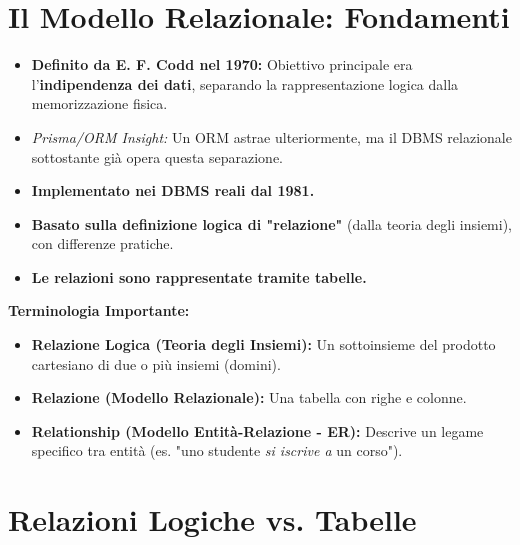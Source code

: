 \documentclass{article}
\begin{document}
	\section{Il Modello Relazionale: Fondamenti}
	\begin{itemize}
		\item \textbf{Definito da E. F. Codd nel 1970:} Obiettivo principale era l'\textbf{indipendenza dei dati}, separando la rappresentazione logica dalla memorizzazione fisica.
		\item \textit{Prisma/ORM Insight:} Un ORM astrae ulteriormente, ma il DBMS relazionale sottostante già opera questa separazione.
		\item \textbf{Implementato nei DBMS reali dal 1981.}
		\item \textbf{Basato sulla definizione logica di "relazione"} (dalla teoria degli insiemi), con differenze pratiche.
		\item \textbf{Le relazioni sono rappresentate tramite tabelle.}
	\end{itemize}
	
	\textbf{Terminologia Importante:}
	\begin{itemize}
		\item \textbf{Relazione Logica (Teoria degli Insiemi):} Un sottoinsieme del prodotto cartesiano di due o più insiemi (domini).
		\item \textbf{Relazione (Modello Relazionale):} Una tabella con righe e colonne.
		\item \textbf{Relationship (Modello Entità-Relazione - ER):} Descrive un legame specifico tra entità (es. "uno studente \textit{si iscrive a} un corso").
	\end{itemize}
	
	\section{Relazioni Logiche vs. Tabelle}
\end{document}
